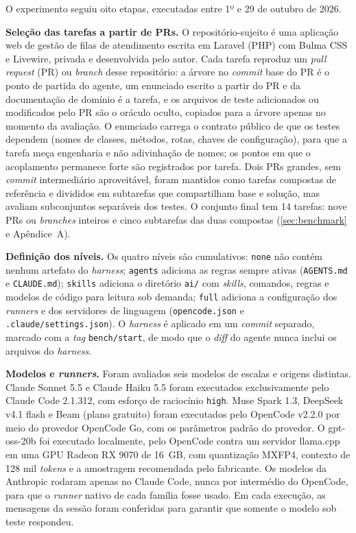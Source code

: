 O experimento seguiu oito etapas, executadas entre 1º e 29 de outubro de 2026.

\textbf{Seleção das tarefas a partir de PRs.} O repositório-sujeito é uma
aplicação web de gestão de filas de atendimento escrita em Laravel (PHP) com
Bulma CSS e Livewire, privada e desenvolvida pelo autor. Cada tarefa reproduz
um \textit{pull request} (PR) ou \textit{branch} desse repositório: a árvore
no \textit{commit} base do PR é o ponto de partida do agente, um enunciado
escrito a partir do PR e da documentação de domínio é a tarefa, e os arquivos
de teste adicionados ou modificados pelo PR são o oráculo oculto, copiados para
a árvore apenas no momento da avaliação. O enunciado carrega o contrato público
de que os testes dependem (nomes de classes, métodos, rotas, chaves de
configuração), para que a tarefa meça engenharia e não adivinhação de nomes;
os pontos em que o acoplamento permanece forte são registrados por tarefa.
Dois PRs grandes, sem \textit{commit} intermediário aproveitável, foram
mantidos como tarefas compostas de referência e divididos em subtarefas que
compartilham base e solução, mas avaliam subconjuntos separáveis dos testes.
O conjunto final tem 14 tarefas: nove PRs ou \textit{branches} inteiros e
cinco subtarefas das duas compostas (\autoref{sec:benchmark} e Apêndice~A).


\textbf{Definição dos níveis.} Os quatro níveis são cumulativos: \texttt{none}
não contém nenhum artefato do \textit{harness}; \texttt{agents} adiciona as
regras sempre ativas (\texttt{AGENTS.md} e \texttt{CLAUDE.md}); \texttt{skills}
adiciona o diretório \texttt{ai/} com \textit{skills}, comandos, regras e
modelos de código para leitura sob demanda; \texttt{full} adiciona a
configuração dos \textit{runners} e dos servidores de linguagem
(\texttt{opencode.json} e \texttt{.claude/settings.json}). O \textit{harness} é
aplicado em um \textit{commit} separado, marcado com a \textit{tag}
\texttt{bench/start}, de modo que o \textit{diff} do agente nunca inclui os
arquivos do \textit{harness}.

\textbf{Modelos e \textit{runners}.} Foram avaliados seis modelos de escalas e
origens distintas. Claude Sonnet 5.5 e Claude Haiku 5.5 foram executados
exclusivamente pelo Claude Code 2.1.312, com esforço de raciocínio
\texttt{high}. Muse Spark 1.3, DeepSeek v4.1 flash e Beam (plano gratuito) foram
executados pelo OpenCode v2.2.0 por meio do provedor OpenCode Go, com os
parâmetros padrão do provedor. O gpt-oss-20b \cite{openai2025gptoss} foi
executado localmente, pelo OpenCode contra um servidor llama.cpp
\cite{llamacpp2025} em uma GPU Radeon RX 9070 de 16~GB, com quantização MXFP4, contexto de
128 mil \textit{tokens} e a amostragem recomendada pelo fabricante. Os modelos
da Anthropic rodaram apenas no Claude Code, nunca por intermédio do OpenCode,
para que o \textit{runner} nativo de cada família fosse usado. Em cada
execução, as mensagens da sessão foram conferidas para garantir que somente o
modelo sob teste respondeu.


